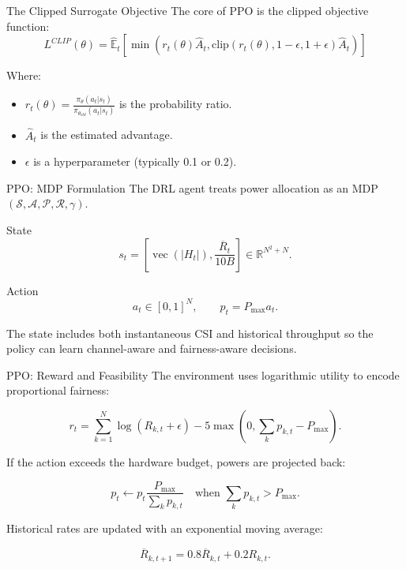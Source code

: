 \documentclass[aspectratio=169]{beamer}
\newcommand{\Rbar}{\overline{R}}
\begin{document}
\begin{frame}{The Clipped Surrogate Objective}
    The core of PPO is the clipped objective function:
    \begin{equation*}
        L^{CLIP}(\theta) = \hat{\mathbb{E}}_t \left[ \min(r_t(\theta)\hat{A}_t, \text{clip}(r_t(\theta), 1-\epsilon, 1+\epsilon)\hat{A}_t) \right]
    \end{equation*}
    
    Where:
    \begin{itemize}
        \item $r_t(\theta) = \frac{\pi_\theta(a_t|s_t)}{\pi_{\theta_{old}}(a_t|s_t)}$ is the probability ratio.
        \item $\hat{A}_t$ is the estimated advantage.
        \item $\epsilon$ is a hyperparameter (typically 0.1 or 0.2).
    \end{itemize}
\end{frame}

\begin{frame}{PPO: MDP Formulation}
  The DRL agent treats power allocation as an MDP
  $(\mathcal{S}, \mathcal{A}, \mathcal{P}, \mathcal{R}, \gamma)$.

  \begin{block}{State}
    \[
      s_t =
      \left[
        \operatorname{vec}(|H_t|),
        \frac{\Rbar_t}{10B}
      \right]
      \in \mathbb{R}^{N^2 + N}.
    \]
  \end{block}

  \begin{block}{Action}
    \[
      a_t \in [0,1]^N,
      \qquad
      p_t = P_{\max}a_t.
    \]
  \end{block}

  The state includes both instantaneous CSI and historical throughput so the policy can learn channel-aware and fairness-aware decisions.
\end{frame}

\begin{frame}{PPO: Reward and Feasibility}
  The environment uses logarithmic utility to encode proportional fairness:

  \[
    r_t =
      \sum_{k=1}^{N}\log(R_{k,t}+\epsilon)
      - 5\max\left(0, \sum_k p_{k,t} - P_{\max}\right).
  \]

  If the action exceeds the hardware budget, powers are projected back:

  \[
    p_t \leftarrow
      p_t \frac{P_{\max}}{\sum_k p_{k,t}}
      \quad \text{when } \sum_k p_{k,t} > P_{\max}.
  \]

  Historical rates are updated with an exponential moving average:

  \[
    \Rbar_{k,t+1}=0.8\Rbar_{k,t}+0.2R_{k,t}.
  \]
\end{frame}
\end{document}
